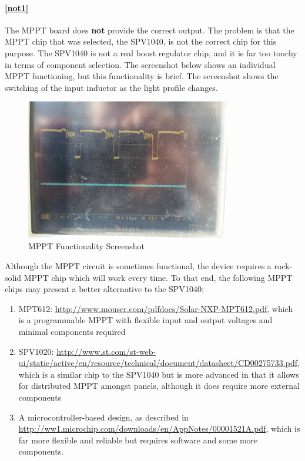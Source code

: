 \documentclass{article}
\numberwithin{figure}{section}
\numberwithin{equation}{section}
\begin{document}
{\paragraph{\ref{not1}}
The MPPT board does \textbf{not} provide the correct output. The problem is that the MPPT chip that was selected, the SPV1040, is not the correct chip for this purpose. The SPV1040 is not a real boost regulator chip, and it is far too touchy in terms of component selection. The screenshot below shows an individual MPPT functioning, but this functionality is brief. The screenshot shows the switching of the input inductor as the light profile changes.

\begin{figure}[H]
	\centering
	\includegraphics[width=0.8\textwidth]{mppt_screenshot}
	\caption{MPPT Functionality Screenshot}
	\label{fig:mppt_screenshot}
\end{figure}

Although the MPPT circuit is sometimes functional, the device requires a rock-solid MPPT chip which will work every time. To that end, the following MPPT chips may present a better alternative to the SPV1040:
\begin{enumerate}
    \item MPT612: \href{http://www.mouser.com/pdfdocs/Solar-NXP-MPT612.pdf}{http://www.mouser.com/pdfdocs/Solar-NXP-MPT612.pdf}, which is a programmable MPPT with flexible input and output voltages and minimal components required
    \item SPV1020: \href{http://www.st.com/st-web-ui/static/active/en/resource/technical/document/datasheet/CD00275733.pdf}{http://www.st.com/st-web-ui/static/active/en/resource/technical/document/datasheet/CD00275733.pdf}, which is a similar chip to the SPV1040 but is more advanced in that it allows for distributed MPPT amongst panels, although it does require more external components
    \item A microcontroller-based design, as described in \href{http://ww1.microchip.com/downloads/en/AppNotes/00001521A.pdf}{http://ww1.microchip.com/downloads/en/AppNotes/00001521A.pdf}, which is far more flexible and reliable but requires software and some more components.
\end{enumerate}

}
\end{document}
